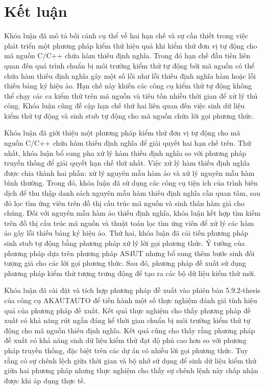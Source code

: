 \chapter{Kết luận}\label{chap5}
Khóa luận đã mô tả bối cảnh cụ thể về hai hạn chế và sự cần thiết trong việc phát triển một phương pháp kiểm thử hiệu quả khi kiểm thử đơn vị tự động cho mã nguồn C/C++ chứa hàm thiếu định nghĩa. Trong đó hạn chế đầu tiên liên quan đến quá trình chuẩn bị môi trường kiểm thử tự động bởi mã nguồn có thể chứa hàm thiếu định nghĩa gây một số lỗi như lỗi thiếu định nghĩa hàm hoặc lỗi thiếu bảng ký hiệu ảo. Hạn chế này khiến các công cụ kiểm thử tự động không thể chạy các ca kiểm thử trên mã nguồn và tiêu tốn nhiều thời gian để xử lý thủ công. Khóa luận cũng đề cập hạn chế thứ hai liên quan đến việc sinh dữ liệu kiểm thử tự động và sinh stub tự động cho mã nguồn chứa lời gọi phương thức. 

Khóa luận đã giới thiệu một phương pháp kiểm thử đơn vị tự động cho mã nguồn C/C++ chứa hàm thiếu định nghĩa để giải quyết hai hạn chế trên. Thứ nhất, khóa luận bổ sung pha xử lý hàm thiếu định nghĩa so với phương pháp truyền thống để giải quyết hạn chế thứ nhất. Việc xử lý hàm thiếu định nghĩa được chia thành hai phần: xử lý nguyên mẫu hàm ảo và xử lý nguyên mẫu hàm bình thường. Trong đó, khóa luận đã sử dụng các công cụ tiện ích của trình biên dịch để thu thập danh sách nguyên mẫu hàm thiếu định nghĩa cần quan tâm, sau đó lọc tìm ứng viên trên đồ thị cấu trúc mã nguồn và sinh thân hàm giả cho chúng. Đối với nguyên mẫu hàm ảo thiếu định nghĩa, khóa luận kết hợp tìm kiếm trên đồ thị cấu trúc mã nguồn và thuật toán lọc tìm ứng viên để xử lý các hàm ảo gây lỗi thiếu bảng ký hiệu ảo. Thứ hai, khóa luận đã cải tiến phương pháp sinh stub tự động bằng phương pháp xử lý lời gọi phương thức. Ý tưởng của phương pháp dựa trên phương pháp AS4UT nhưng bổ sung thêm bước sinh đối tượng giả cho các lời gọi phương thức. Sau đó, phương pháp đề xuất sử dụng phương pháp kiểm thử tượng trưng động để tạo ra các bộ dữ liệu kiểm thử mới.

Khóa luận đã cài đặt và tích hợp phương pháp đề xuất vào phiên bản 5.9.2-thesis của công cụ AKAUTAUTO để tiến hành một số thực nghiệm đánh giá tính hiệu quả của phương pháp đề xuất. Kết quả thực nghiệm cho thấy phương pháp đề xuất có khả năng rút ngắn đáng kể thời gian chuẩn bị môi trường kiểm thử tự động cho mã nguồn thiếu định nghĩa. Kết quả cũng cho thấy rằng phương pháp đề xuất có khả năng sinh dữ liệu kiểm thử đạt độ phủ cao hơn so với phương pháp truyền thống, đặc biệt trên các dự án có nhiều lời gọi phương thức. Tuy rằng có sự chênh lệch giữa thời gian và bộ nhớ sử dụng để sinh dữ liệu kiểm thử giữa hai phương pháp nhưng thực nghiệm cho thấy sự chênh lệnh này chấp nhận được khi áp dụng thực tế. 

